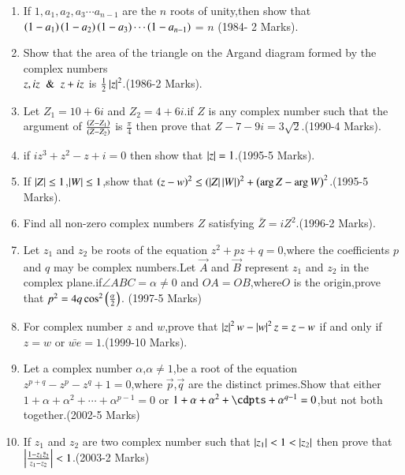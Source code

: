 \documentclass[journal]{IEEEtran}
\begin{document}
\begin{enumerate}[start=7] %
\item If $1,a_{1},a_{2},a_{3}\cdots a_{n-1}$ are the $n$ roots of unity,then show that $\left(1-a_1\right)\left(1-a_2\right)\left(1-a_3\right)\cdots \left(1-a_{n-1}\right)$ = $n$ \hfill (1984- 2 Marks).\\
\item Show that the area of the triangle on the Argand diagram formed by the complex numbers\\
$z,iz \And z+iz$ is $\frac{1}{2}\left\vert z\right\vert^{2}$.\hfill (1986-2 Marks).\\
\item Let $Z_{1}=10+6i$ and $Z_{2}=4+6i$.if $Z$ is any complex number such that the argument of ${\frac{\left(Z-Z_1\right)}{\left(Z-Z_2\right)}}$ is ${\frac{\pi}{4}}$ then prove that $Z-7-9i=3\sqrt{2}$.\hfill(1990-4 Marks).\\
\item if {$iz^{3}+z^2-z+i=0$} then show that $\left\vert z\right\vert=1$.\hfill(1995-5 Marks).\\
\item If $\left\vert Z\right\vert\le1$,$\left\vert W\right\vert\le1$,show that $\left(z-w\right)^{2}\le\left(\left\vert Z\right\vert\left\vert W\right\vert\right)^{2}+\left(\arg Z-\arg W\right)^2$.\hfill(1995-5 Marks). \\
\item Find all non-zero complex numbers $Z$ satisfying $\bar Z=iZ^{2}$.\hfill(1996-2 Marks).\\
\item Let $z_{1}$ and $z_{2}$ be roots of the equation $z^{2}+pz+q=0$,where the coefficients $p$ and $q$ may be complex numbers.Let $\Vec{A}$ and $\Vec{B}$ represent $z_{1}$ and $z_{2}$ in the complex plane.if$\angle ABC=\alpha\not=0$ and $OA=OB$,where$O$ is the origin,prove that $p^{2}=4q\cos^{2}\left(\frac{\alpha}{2}\right)$. \hfill(1997-5 Marks)\\
\item For complex number $z$ and $w$,prove that $\left\vert z\right\vert^{2}w-\left\vert w\right\vert^{2}z=z-w$ if and only if $z=w$ or $\bar{we}=1$.\hfill(1999-10 Marks).\\
\item Let a complex number $\alpha$,$\alpha \not=1$,be a root of the equation $z^{p+q}-z^p-z^q+1=0$,where $\Vec{p}$,$\Vec{q}$ are the distinct primes.Show that either $1+\alpha+\alpha^{2}+\cdots+\alpha^{p-1}=0$ or $1+\alpha+\alpha^{2}+\cdpts+\alpha^{q- 1}=0$,but not both together.\hfill(2002-5 Marks)\\
\item If $z_{1}$ and $z_{2}$ are two complex number such that $\left\vert z_{1}\right\vert<1<\left\vert z_{2}\right\vert$ then prove that  $\left\vert\frac{1-z_{1} \bar z_{2}}{z_{1}-z_{2}}\right\vert<1$.\hfill(2003-2 Marks)\\

\end{enumerate}
\end{document}
